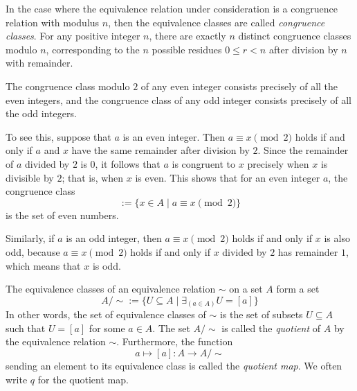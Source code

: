 \begin{example}
  In the case where the equivalence relation under consideration is a congruence relation with modulus $n$, then the equivalence classes are called \emph{congruence classes}. For any positive integer $n$, there are exactly $n$ distinct congruence classes modulo $n$, corresponding to the $n$ possible residues $0\leq r<n$ after division by $n$ with remainder.

  The congruence class modulo $2$ of any even integer consists precisely of all the even integers, and the congruence class of any odd integer consists precisely of all the odd integers.

  To see this, suppose that $a$ is an even integer. Then $a \equiv x\pmod{2}$ holds if and only if $a$ and $x$ have the same remainder after division by $2$. Since the remainder of $a$ divided by $2$ is $0$, it follows that $a$ is congruent to $x$ precisely when $x$ is divisible by $2$; that is, when $x$ is even. This shows that for an even integer $a$, the congruence class
  \begin{equation*}
    [a] := \{x\in A \mid a \equiv x\pmod {2}\}
  \end{equation*}
  is the set of even numbers.

  Similarly, if $a$ is an odd integer, then $a\equiv x\pmod{2}$ holds if and only if $x$ is also odd, because $a\equiv x\pmod{2}$ holds if and only if $x$ divided by $2$ has remainder $1$, which means that $x$ is odd.
\end{example}

The equivalence classes of an equivalence relation $\sim$ on a set $A$ form a set
\begin{equation*}
  A/{\sim} := \{U\subseteq A \mid \exists_{(a\in A)}U=[a]\}
\end{equation*}
In other words, the set of equivalence classes of $\sim$ is the set of subsets $U\subseteq A$ such that $U=[a]$ for some $a\in A$. The set $A/{\sim}$ is called the \emph{quotient} of $A$ by the equivalence relation $\sim$. Furthermore, the function
\begin{equation*}
  a\mapsto [a]:A\to A/{\sim}
\end{equation*}
sending an element to its equivalence class is called the \emph{quotient map}. We often write $q$ for the quotient map.


